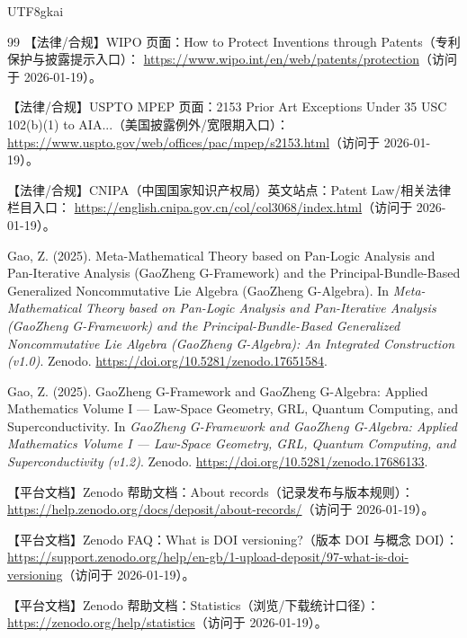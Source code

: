 \documentclass[12pt]{article}
\begin{document}
\begin{CJK*}{UTF8}{gkai}
\begin{thebibliography}{99}
【法律/合规】WIPO 页面：How to Protect Inventions through Patents（专利保护与披露提示入口）：
\url{https://www.wipo.int/en/web/patents/protection}（访问于 2026-01-19）。

【法律/合规】USPTO MPEP 页面：2153 Prior Art Exceptions Under 35 USC 102(b)(1) to AIA...（美国披露例外/宽限期入口）：
\url{https://www.uspto.gov/web/offices/pac/mpep/s2153.html}（访问于 2026-01-19）。

【法律/合规】CNIPA（中国国家知识产权局）英文站点：Patent Law/相关法律栏目入口：
\url{https://english.cnipa.gov.cn/col/col3068/index.html}（访问于 2026-01-19）。

Gao, Z. (2025).
\newblock Meta-Mathematical Theory based on Pan-Logic Analysis and
Pan-Iterative Analysis (GaoZheng G-Framework) and the
Principal-Bundle-Based Generalized Noncommutative Lie Algebra
(GaoZheng G-Algebra).
\newblock In \emph{Meta-Mathematical Theory based on Pan-Logic Analysis and
Pan-Iterative Analysis (GaoZheng G-Framework) and the
Principal-Bundle-Based Generalized Noncommutative Lie Algebra
(GaoZheng G-Algebra): An Integrated Construction (v1.0)}.
\newblock Zenodo.
\newblock \url{https://doi.org/10.5281/zenodo.17651584}.


Gao, Z. (2025).
\newblock GaoZheng G-Framework and GaoZheng G-Algebra: Applied Mathematics Volume I — Law-Space Geometry, GRL, Quantum
  Computing, and Superconductivity.
\newblock In \emph{GaoZheng G-Framework and GaoZheng G-Algebra: Applied Mathematics Volume I — Law-Space Geometry, GRL,
  Quantum Computing, and Superconductivity (v1.2)}.
\newblock Zenodo.
\newblock \url{https://doi.org/10.5281/zenodo.17686133}.


【平台文档】Zenodo 帮助文档：About records（记录发布与版本规则）：
\url{https://help.zenodo.org/docs/deposit/about-records/}（访问于 2026-01-19）。

【平台文档】Zenodo FAQ：What is DOI versioning?（版本 DOI 与概念 DOI）：
\url{https://support.zenodo.org/help/en-gb/1-upload-deposit/97-what-is-doi-versioning}（访问于 2026-01-19）。

【平台文档】Zenodo 帮助文档：Statistics（浏览/下载统计口径）：
\url{https://zenodo.org/help/statistics}（访问于 2026-01-19）。

\end{thebibliography}

\clearpage

\end{CJK*}
\end{document}
